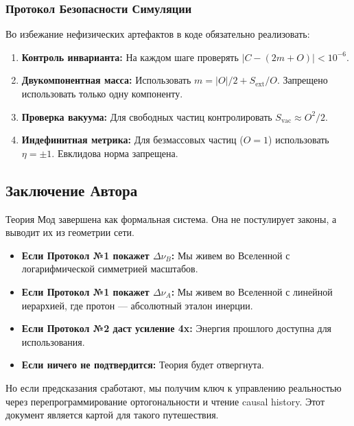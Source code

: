 \documentclass[12pt,a4paper]{article}
\begin{document}
\subsubsection{Протокол Безопасности Симуляции}
Во избежание нефизических артефактов в коде обязательно реализовать:
\begin{enumerate}
    \item \textbf{Контроль инварианта:} На каждом шаге проверять $|C - (2m + O)| < 10^{-6}$.
    \item \textbf{Двукомпонентная масса:} Использовать $m = |O|/2 + S_{\text{ext}}/O$. Запрещено использовать только одну компоненту.
    \item \textbf{Проверка вакуума:} Для свободных частиц контролировать $S_{\text{vac}} \approx O^2/2$.
    \item \textbf{Индефинитная метрика:} Для безмассовых частиц ($O=1$) использовать $\eta = \pm 1$. Евклидова норма запрещена.
\end{enumerate}

\subsection*{Заключение Автора}
Теория Мод завершена как формальная система. Она не постулирует законы, а выводит их из геометрии сети.
\begin{itemize}
    \item \textbf{Если Протокол №1 покажет $\Delta \nu_B$:} Мы живем во Вселенной с логарифмической симметрией масштабов.
    \item \textbf{Если Протокол №1 покажет $\Delta \nu_A$:} Мы живем во Вселенной с линейной иерархией, где протон — абсолютный эталон инерции.
    \item \textbf{Если Протокол №2 даст усиление 4x:} Энергия прошлого доступна для использования.
    \item \textbf{Если ничего не подтвердится:} Теория будет отвергнута.
\end{itemize}

Но если предсказания сработают, мы получим ключ к управлению реальностью через перепрограммирование ортогональности и чтение causal history. Этот документ является картой для такого путешествия.

\end{document}
